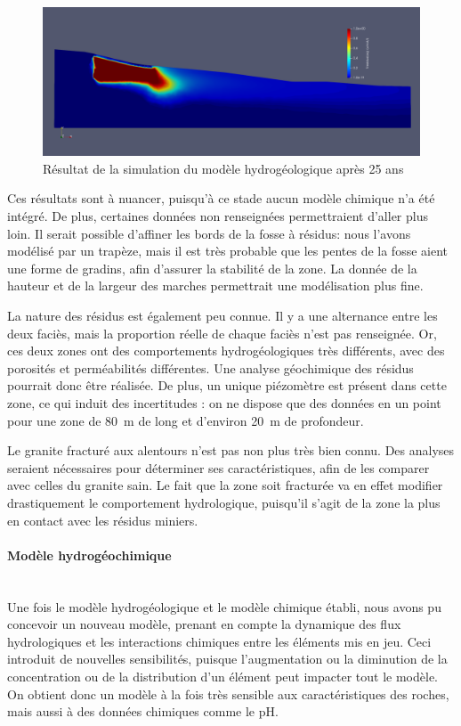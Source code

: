 \documentclass{article}
\begin{document}
\begin{figure}[H]
    \centering
    \includegraphics[width=0.6\linewidth]{III_B_3_8.png}
    \caption{Résultat de la simulation du modèle hydrogéologique après 25 ans}
    \label{hytec_hydro_25ans}
\end{figure}

Ces résultats sont à nuancer, puisqu’à ce stade aucun modèle chimique n’a été intégré. De plus, certaines données non renseignées permettraient d’aller plus loin. Il serait possible d’affiner les bords de la fosse à résidus: nous l’avons modélisé par un trapèze, mais il est très probable que les pentes de la fosse aient une forme de gradins, afin d’assurer la stabilité de la zone. La donnée de la hauteur et de la largeur des marches permettrait une modélisation plus fine.

La nature des résidus est également peu connue. Il y a une alternance entre les deux faciès, mais la proportion réelle de chaque faciès n’est pas renseignée. Or, ces deux zones ont des comportements hydrogéologiques très différents, avec des porosités et perméabilités différentes. Une analyse géochimique des résidus pourrait donc être réalisée. De plus, un unique piézomètre est présent dans cette zone, ce qui induit des incertitudes : on ne dispose que des données en un point pour une zone de 80~m de long et d’environ 20~m de profondeur.

Le granite fracturé aux alentours n’est pas non plus très bien connu. Des analyses seraient nécessaires pour déterminer ses caractéristiques, afin de les comparer avec celles du granite sain. Le fait que la zone soit fracturée va en effet modifier drastiquement le comportement hydrologique, puisqu’il s’agit de la zone la plus en contact avec les résidus miniers.

\paragraph{Modèle hydrogéochimique \\ \\}
Une fois le modèle hydrogéologique et le modèle chimique établi, nous avons pu concevoir un nouveau modèle, prenant en compte la dynamique des flux hydrologiques et les interactions chimiques entre les éléments mis en jeu. Ceci introduit de nouvelles sensibilités, puisque l’augmentation ou la diminution de la concentration ou de la distribution d’un élément peut impacter tout le modèle. On obtient donc un modèle à la fois très sensible aux caractéristiques des roches, mais aussi à des données chimiques comme le pH.
\end{document}

